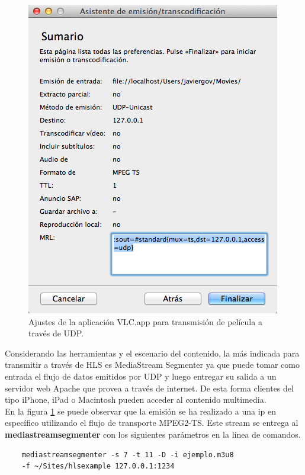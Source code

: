 \begin{figure}[H]
	\centering
	\includegraphics[scale=0.5]{imgs/vlc_transmission.png}
	\caption{Ajustes de la aplicación VLC.app para transmisión de película a través de UDP.}
	\label{vlc_transmission}	
\end{figure}


Considerando las herramientas y el escenario del contenido, la más indicada para transmitir a través de HLS es MediaStream Segmenter ya que puede tomar como entrada el flujo de datos emitidos por UDP y luego entregar su salida a un servidor web Apache que provea a través de internet. De esta forma clientes del tipo iPhone, iPad o Macintosh pueden acceder al contenido multimedia.\\

En la figura \ref{vlc_transmission} se puede observar que la emisión se ha realizado a una ip en específico utilizando el flujo de transporte MPEG2-TS. Este stream se entrega al \textbf{mediastreamsegmenter} con los siguientes parámetros en la línea de comandos.

 \begin{lstlisting}
	mediastreamsegmenter -s 7 -t 11 -D -i ejemplo.m3u8 
	-f ~/Sites/hlsexample 127.0.0.1:1234
\end{lstlisting}

